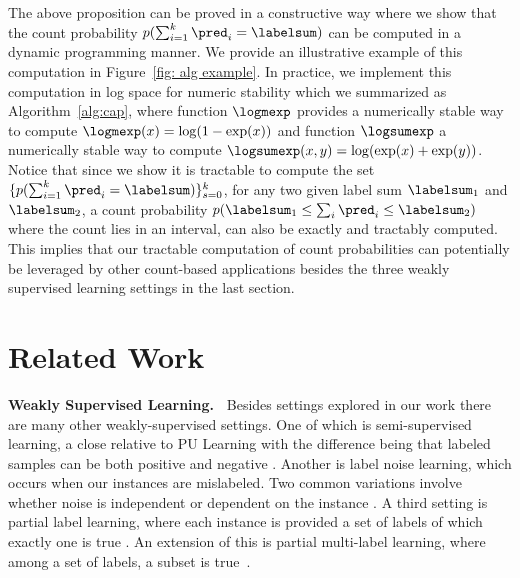 \documentclass{article}
\begin{document}
The above proposition can be proved in a constructive way where we show that the count probability $p(\sum_{i = 1}^k \pred_i = \labelsum)$ can be computed in a dynamic programming manner.
We provide an illustrative example of this computation in Figure~\ref{fig: alg example}.
In practice, we implement this computation in log space for numeric stability which we summarized as Algorithm~\ref{alg:cap}, where function $\logmexp$ provides a numerically stable way to compute $\logmexp(x) = \log(1 - \exp(x))$ and function $\logsumexp$ a numerically stable way to compute $\logsumexp(x, y) = \log(\exp(x) + \exp(y))$.
Notice that since we show it is tractable to compute the set $\{ p(\sum_{i = 1}^k \pred_i = \labelsum) \}_{s = 0}^{k}$,
for any two given label sum $\labelsum_1$ and $\labelsum_2$,
a count probability $p(\labelsum_1 \leq \sum_{i} \pred_i \leq \labelsum_2)$ where the count lies in an interval, can also be exactly and tractably computed.
This implies that our tractable computation of count probabilities can potentially be leveraged by other count-based applications besides the three weakly supervised learning settings in the last section.


























\section{Related Work}
\textbf{Weakly Supervised Learning.\ } Besides settings explored in our work there are many other weakly-supervised settings. One of which is semi-supervised learning, a close relative to PU Learning with the difference being that labeled samples can be both positive and negative \citep{zhu2022introduction, zhu2005semi}. Another is label noise learning, which occurs when our instances are mislabeled. Two common variations involve whether noise is independent or dependent on the instance \citep{frenay2013classification, song2022learning}. A third setting is partial label learning, where each instance is provided a set of labels of which exactly one is true \citep{cour2011learning}. An extension of this is partial multi-label learning, where among a set of labels, a subset is true~\citep{xie2018partial}.
\end{document}
